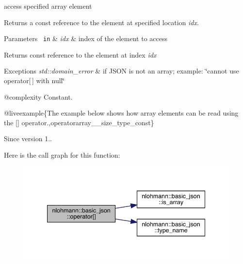 access specified array element 

Returns a const reference to the element at specified location {\itshape idx}.


\begin{DoxyParams}[1]{Parameters}
\mbox{\texttt{ in}}  & {\em idx} & index of the element to access\\
\hline
\end{DoxyParams}
\begin{DoxyReturn}{Returns}
const reference to the element at index {\itshape idx} 
\end{DoxyReturn}

\begin{DoxyExceptions}{Exceptions}
{\em std\+::domain\+\_\+error} & if J\+S\+ON is not an array; example\+: {\ttfamily \char`\"{}cannot use
operator\mbox{[}$\,$\mbox{]} with null\char`\"{}}\\
\hline
\end{DoxyExceptions}
@complexity Constant.

@liveexample\{The example below shows how array elements can be read using the {\ttfamily \mbox{[}\mbox{]}} operator.,operatorarray\+\_\+\+\_\+size\+\_\+type\+\_\+const\}

\begin{DoxySince}{Since}
version 1.. 
\end{DoxySince}
Here is the call graph for this function\+:
\nopagebreak
\begin{figure}[H]
\begin{center}
\leavevmode
\includegraphics[width=341pt]{classnlohmann_1_1basic__json_a9cb592cd85c14f3e845e30d51cf17efb_cgraph}
\end{center}
\end{figure}
\mbox{\label{classnlohmann_1_1basic__json_a233b02b0839ef798942dd46157cc0fe6}} 
